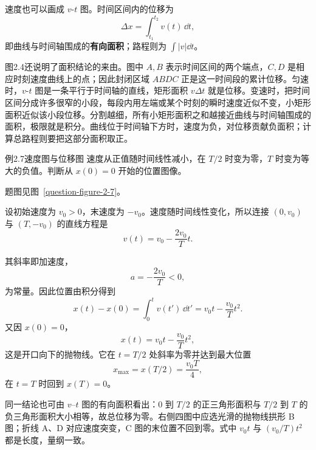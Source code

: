 速度也可以画成 $v$-$t$ 图。时间区间内的位移为
\begin{equation}
  \Delta x=\int_{t_1}^{t_2}v(t)\,\dd t,
\end{equation}
即曲线与时间轴围成的\textbf{有向面积}；路程则为 $\int|v|\dd t$。

图2.4还说明了面积结论的来由。图中 $A,B$ 表示时间区间的两个端点，$C,D$ 是相应时刻速度曲线上的点；因此封闭区域 $ABDC$ 正是这一时间段的累计位移。匀速时，$v$-$t$ 图是一条平行于时间轴的直线，矩形面积 $v\Delta t$ 就是位移。变速时，把时间区间分成许多很窄的小段，每段内用左端或某个时刻的瞬时速度近似不变，小矩形面积近似该小段位移。分割越细，所有小矩形面积之和越接近曲线与时间轴围成的面积，极限就是积分。曲线位于时间轴下方时，速度为负，对位移贡献负面积；计算总路程则要把这部分面积取正。

\VelocityAreaDiagram

\begin{origexamplebox}{例2.7\quad 速度图与位移图}
速度从正值随时间线性减小，在 $T/2$ 时变为零，$T$ 时变为等大的负值。判断从 $x(0)=0$ 开始的位置图像。
\par 题图见图~\ref{question-figure-2-7}。
\KQuestionAH
\end{origexamplebox}
\begin{xesolution}
设初始速度为 $v_0>0$，末速度为 $-v_0$。速度随时间线性变化，所以连接 $(0,v_0)$ 与 $(T,-v_0)$ 的直线方程是
\[
 v(t)=v_0-\frac{2v_0}{T}t.
\]
\ExampleTwoSevenGraphs

其斜率即加速度，
\[
 a=-\frac{2v_0}{T}<0,
\]
为常量。因此位置由积分得到
\[
 x(t)-x(0)=\int_0^t v(t')\,\dd t'
 =v_0t-\frac{v_0}{T}t^2.
\]
又因 $x(0)=0$，
\[
 \boxed{x(t)=v_0t-\frac{v_0}{T}t^2},
\]
这是开口向下的抛物线。它在 $t=T/2$ 处斜率为零并达到最大位置
\[
 x_{\max}=x(T/2)=\frac{v_0T}{4},
\]
在 $t=T$ 时回到 $x(T)=0$。

同一结论也可由 $v$--$t$ 图的有向面积看出：$0$ 到 $T/2$ 的正三角形面积与 $T/2$ 到 $T$ 的负三角形面积大小相等，故总位移为零。右侧四图中应选光滑的抛物线拱形 B 图；折线 A、D 对应速度突变，C 图的末位置不回到零。式中 $v_0t$ 与 $(v_0/T)t^2$ 都是长度，量纲一致。
\end{xesolution}

